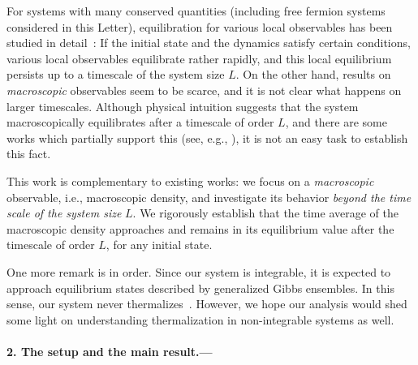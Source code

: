 \documentclass[aps,prl,superscriptaddress,reprint]{revtex4-2}
\newcommand{\se}[1]{\paragraph{#1.---}}
\theoremstyle{definition}
\begin{document}
For systems with many conserved quantities
(including free fermion systems considered in this Letter),
equilibration for various {local} observables
has been studied in
detail~\cite{Bartell-PhysRevLett.100,Cramer-Eisert-2010,Cazalilla-PhysRevE.85.011133,Sotiriadis_2014,Gluza-et-al-PRL117,Vidmar-Rigol2016JSM,Gluza-Eisert-Farrelly2019,Murthy-Srednicki-PRE100,Gluza-Eisert-Farrelly2019}:
If the initial state and the dynamics satisfy certain conditions,
various local observables equilibrate  rather rapidly, and
this local equilibrium persists up to
a timescale of the system size $L$.
On the other hand,
results on \emph{macroscopic} observables seem to be scarce,
and it is not clear what happens
on larger timescales.
Although physical intuition suggests that the system macroscopically
equilibrates
after a timescale of order $L$, and there
are some works
which
partially support this (see, e.g.,
\cite[eq.~(51)]{Murthy-Srednicki-PRE100}),
it is not an easy task to establish this fact.


This work is  complementary to
existing works: we focus on a \emph{macroscopic} observable,
i.e.,  macroscopic density,
and investigate its behavior
\emph{beyond the time scale of the system size} $L$.
We rigorously
establish that the time average of the macroscopic density approaches
and remains in
its equilibrium value after the timescale of order $L$,
for any initial state.

One more remark is in order.
Since our system is integrable, it is expected to approach
equilibrium states described by generalized Gibbs
ensembles.
In this sense,
our system never thermalizes~\cite{Note1}.
However,
we hope our analysis would shed some light on understanding
thermalization in non-integrable systems as well.






\se{2. The setup and the main result}
\end{document}
